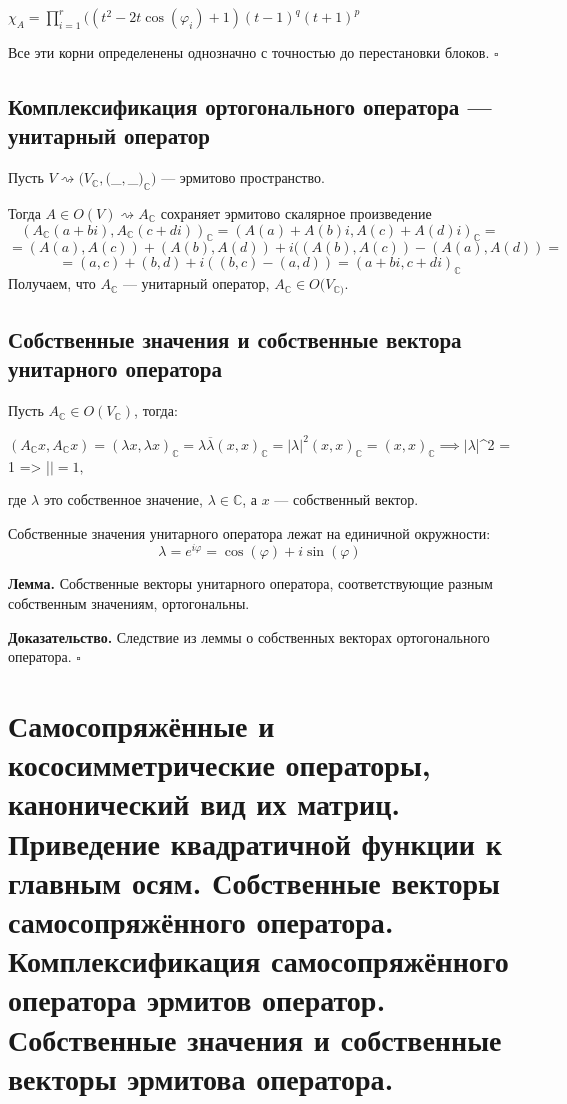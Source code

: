 \documentclass[12pt]{article}
\begin{document}
$\chi_A = \prod^r_{i = 1} ((t^2 - 2t\cos(\varphi_i) + 1)(t-1)^q(t+1)^p$

Все эти корни определенены однозначно с точностью до перестановки блоков. $\square$

\subsection{Комплексификация
 ортогонального оператора — унитарный оператор}
 
Пусть $V \rightsquigarrow (V_\mathbb{C}, ($_$,$_$)_\mathbb{C})$ — эрмитово пространство.

Тогда $A \in O(V) \rightsquigarrow A_\mathbb{C} $ сохраняет эрмитово скалярное произведение
\[
(A_\mathbb{C}(a+bi),A_\mathbb{C}(c+di))_\mathbb{C} = (A(a) + A(b)i, A(c) + A(d)i)_\mathbb{C} = 
\]
\[= (A(a), A(c)) + (A(b), A(d)) + i((A(b), A(c))-(A(a),A(d)) =
\]
\[
= (a,c) + (b,d) + i((b,c) - (a,d)) = (a+bi, c+di)_\mathbb{C}
\]
Получаем, что $A_\mathbb{C}$ — унитарный оператор, $A_\mathbb{C} \in O(V_\mathbb{C)}$.

\subsection{Собственные значения и собственные вектора
 унитарного оператора}
Пусть $A_\mathbb{C} \in O(V_\mathbb{C})$, тогда: 

$(A_\mathbb{C}x,A_\mathbb{C}x) = (\lambda x,\lambda x)_\mathbb{C}= \lambda \overline{\lambda}(x,x)_\mathbb{C}= |\lambda|^2(x,x)_\mathbb{C}= (x,x)_\mathbb{C} \implies |\lambda$|^2 = 1 => |\lambda$| = 1,$

где $\lambda$ это собственное значение, $\lambda \in \mathbb{C}$, а $x$ — собственный вектор.

Собственные значения унитарного оператора лежат на единичной окружности:
$$\lambda = e^{i\varphi} = \cos(\varphi) + i\sin(\varphi)$$

\textbf{Лемма.} Собственные векторы унитарного оператора, соответствующие
 разным собственным значениям, ортогональны.

 \textbf{Доказательство.}
 Следствие из леммы о собственных векторах ортогонального оператора. $\square$
 
 \section{Самосопряжённые и кососимметрические операторы, канонический вид их матриц. Приведение квадратичной функции к главным осям. Собственные векторы самосопряжённого оператора. Комплексификация самосопряжённого оператора эрмитов оператор. Собственные значения и собственные векторы эрмитова оператора.}
\end{document}
